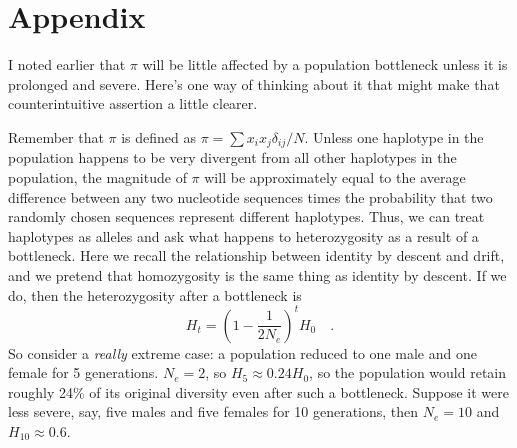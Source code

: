 \section*{Appendix}\label{sect:appendix}

I noted earlier that $\pi$ will be little affected by a population
bottleneck unless it is prolonged and severe. Here's one way of
thinking about it that might make that counterintuitive assertion a
little clearer.

Remember that $\pi$ is defined as $\pi = \sum
x_ix_j\delta_{ij}/N$. Unless one haplotype in the population happens
to be very divergent from all other haplotypes in the population, the
magnitude of $\pi$ will be approximately equal to the average
difference between any two nucleotide sequences times the probability
that two randomly chosen sequences represent different
haplotypes. Thus, we can treat haplotypes as alleles and ask what
happens to heterozygosity as a result of a bottleneck. Here we recall
the relationship between identity by descent and drift, and we pretend
that homozygosity is the same thing as identity by descent. If we do,
then the heterozygosity after a bottleneck is
\[
H_t = \left(1 - \frac{1}{2N_e}\right)^tH_{0} \quad.
\]
So consider a {\it really\/} extreme case: a population reduced to one
male and one female for 5 generations. $N_e=2$, so $H_5 \approx
0.24H_0$, so the population would retain roughly 24\% of its original
diversity even after such a bottleneck. Suppose it were less severe,
say, five males and five females for 10 generations, then $N_e=10$ and
$H_{10} \approx 0.6$.

